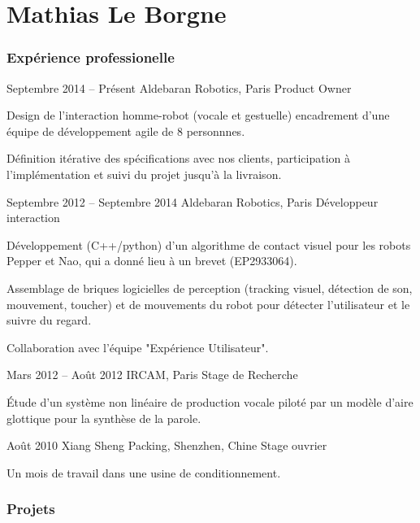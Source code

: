 \documentclass{tccv}
\begin{document}
\part{Mathias Le Borgne}

\section{Expérience professionelle}

\begin{eventlist}

\item{Septembre 2014 -- Présent}
     {Aldebaran Robotics, Paris}
     {Product Owner}

Design de l'interaction homme-robot (vocale et gestuelle) 
encadrement d'une équipe de développement agile de 8 personnnes.

Définition itérative des spécifications avec nos clients,
participation à l'implémentation 
et suivi du projet jusqu'à la livraison.

\item{Septembre 2012 -- Septembre 2014}
     {Aldebaran Robotics, Paris}
     {Développeur interaction}

Développement (C++/python)
d'un algorithme de contact visuel 
pour les robots Pepper et Nao, 
qui a donné lieu à un brevet (EP2933064).

Assemblage de briques logicielles de perception
(tracking visuel, détection de son, mouvement, toucher) 
et de mouvements du robot
pour détecter l'utilisateur et le suivre du regard.

Collaboration avec l'équipe "Expérience Utilisateur".

\item{Mars 2012 -- Août 2012}
     {IRCAM, Paris}
     {Stage de Recherche}

Étude d'un système non linéaire de production vocale piloté par un
modèle d’aire glottique pour la synthèse de la parole.


\item{Août 2010}
     {Xiang Sheng Packing, Shenzhen, Chine}
     {Stage ouvrier}

Un mois de travail dans une usine de conditionnement.


\section{Projets}

\begin{eventlist}


\end{eventlist}
\end{eventlist}
\end{document}
